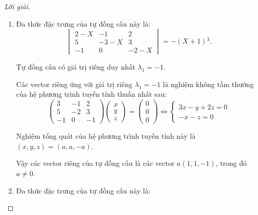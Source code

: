 \documentclass[class=linearalgebra,crop=false]{standalone}
\begin{document}
\begin{proof}[Lời giải]
    \begin{enumerate}[label = (\alph*)]
        \item Đa thức đặc trưng của tự đồng cấu này là:
              \[
                  \begin{vmatrix}
                      2 - X & -1     & 2      \\
                      5     & -3 - X & 3      \\
                      -1    & 0      & -2 - X
                  \end{vmatrix}
                  = -(X+1){}^{3}.
              \]
              \par Tự đồng cấu có giá trị riêng duy nhất $\lambda_{1} = -1$.
              \par Các vector riêng ứng với giá trị riêng $\lambda_{1} = -1$ là nghiệm không tầm thường của hệ phương trình tuyến tính thuần nhất sau:
              \[
                  \begin{pmatrix}
                      3  & -1 & 2  \\
                      5  & -2 & 3  \\
                      -1 & 0  & -1
                  \end{pmatrix}
                  \begin{pmatrix}
                      x \\
                      y \\
                      z
                  \end{pmatrix}
                  =
                  \begin{pmatrix}
                      0 \\
                      0 \\
                      0
                  \end{pmatrix}
                  \Longleftrightarrow
                  \begin{cases}
                      3x - y + 2z = 0 \\
                      -x - z = 0
                  \end{cases}
              \]
              \par Nghiệm tổng quát của hệ phương trình tuyến tính này là $(x, y, z) = (a, a, -a)$.
              \par Vậy các vector riêng của tự đồng cấu là các vector $a(1, 1, -1)$, trong đó $a\ne 0$.
        \item Đa thức đặc trưng của tự đồng cấu này là:

\end{enumerate}
\end{proof}
\end{document}
